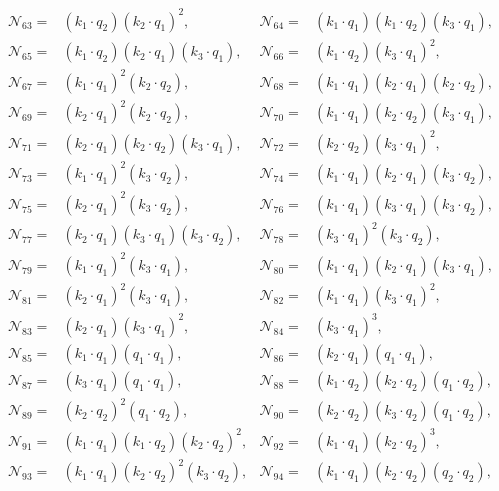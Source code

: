 \documentclass[twocolumn,aps,showpacs,nofootinbib,superscriptaddress,prd]{revtex4-2}
\begin{document}
\begin{widetext}
\begin{align}
{\mathcal N}_{63}=&(k_1\cdot q_2) (k_2\cdot q_1)^2,&
{\mathcal N}_{64}=&(k_1\cdot q_1) (k_1\cdot q_2) (k_3\cdot q_1),\nonumber\\
{\mathcal N}_{65}=&(k_1\cdot q_2) (k_2\cdot q_1) (k_3\cdot q_1),&
{\mathcal N}_{66}=&(k_1\cdot q_2) (k_3\cdot q_1)^2,\nonumber\\
{\mathcal N}_{67}=&(k_1\cdot q_1)^2 (k_2\cdot q_2),&
{\mathcal N}_{68}=&(k_1\cdot q_1) (k_2\cdot q_1) (k_2\cdot q_2),\nonumber\\
{\mathcal N}_{69}=&(k_2\cdot q_1)^2 (k_2\cdot q_2),&
{\mathcal N}_{70}=&(k_1\cdot q_1) (k_2\cdot q_2) (k_3\cdot q_1),\nonumber\\
{\mathcal N}_{71}=&(k_2\cdot q_1) (k_2\cdot q_2) (k_3\cdot q_1),&
{\mathcal N}_{72}=&(k_2\cdot q_2) (k_3\cdot q_1)^2,\nonumber\\
{\mathcal N}_{73}=&(k_1\cdot q_1)^2 (k_3\cdot q_2),&
{\mathcal N}_{74}=&(k_1\cdot q_1) (k_2\cdot q_1) (k_3\cdot q_2),\nonumber\\
{\mathcal N}_{75}=&(k_2\cdot q_1)^2 (k_3\cdot q_2),&
{\mathcal N}_{76}=&(k_1\cdot q_1) (k_3\cdot q_1) (k_3\cdot q_2),\nonumber\\
{\mathcal N}_{77}=&(k_2\cdot q_1) (k_3\cdot q_1) (k_3\cdot q_2),&
{\mathcal N}_{78}=&(k_3\cdot q_1)^2 (k_3\cdot q_2),\nonumber\\
{\mathcal N}_{79}=&(k_1\cdot q_1)^2 (k_3\cdot q_1),&
{\mathcal N}_{80}=&(k_1\cdot q_1) (k_2\cdot q_1) (k_3\cdot q_1),\nonumber\\
{\mathcal N}_{81}=&(k_2\cdot q_1)^2 (k_3\cdot q_1),&
{\mathcal N}_{82}=&(k_1\cdot q_1) (k_3\cdot q_1)^2,\nonumber\\
{\mathcal N}_{83}=&(k_2\cdot q_1) (k_3\cdot q_1)^2,&
{\mathcal N}_{84}=&(k_3\cdot q_1)^3,\nonumber\\
{\mathcal N}_{85}=&(k_1\cdot q_1) (q_1\cdot q_1),&
{\mathcal N}_{86}=&(k_2\cdot q_1) (q_1\cdot q_1),\nonumber\\
{\mathcal N}_{87}=&(k_3\cdot q_1) (q_1\cdot q_1),&
{\mathcal N}_{88}=&(k_1\cdot q_2) (k_2\cdot q_2) (q_1\cdot q_2),\nonumber\\
{\mathcal N}_{89}=&(k_2\cdot q_2)^2 (q_1\cdot q_2),&
{\mathcal N}_{90}=&(k_2\cdot q_2) (k_3\cdot q_2) (q_1\cdot q_2),\nonumber\\
{\mathcal N}_{91}=&(k_1\cdot q_1) (k_1\cdot q_2) (k_2\cdot q_2)^2,&
{\mathcal N}_{92}=&(k_1\cdot q_1) (k_2\cdot q_2)^3,\nonumber\\
{\mathcal N}_{93}=&(k_1\cdot q_1) (k_2\cdot q_2)^2 (k_3\cdot q_2),&
{\mathcal N}_{94}=&(k_1\cdot q_1) (k_2\cdot q_2) (q_2\cdot q_2),\nonumber\\

\end{align}
\end{widetext}
\end{document}
